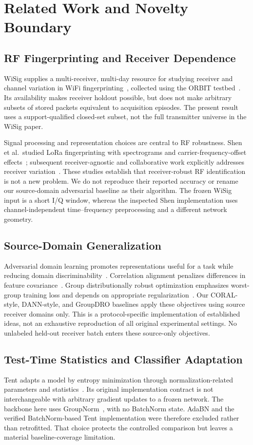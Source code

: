 \section{Related Work and Novelty Boundary}
\subsection{RF Fingerprinting and Receiver Dependence}
WiSig supplies a multi-receiver, multi-day resource for studying receiver and channel variation in WiFi fingerprinting~\cite{wisig}, collected using the ORBIT testbed~\cite{orbit}. Its availability makes receiver holdout possible, but does not make arbitrary subsets of stored packets equivalent to acquisition episodes. The present result uses a support-qualified closed-set subset, not the full transmitter universe in the WiSig paper.

Signal processing and representation choices are central to RF robustness. Shen et al.\ studied LoRa fingerprinting with spectrograms and carrier-frequency-offset effects~\cite{shenlora}; subsequent receiver-agnostic and collaborative work explicitly addresses receiver variation~\cite{shen}. These studies establish that receiver-robust RF identification is not a new problem. We do not reproduce their reported accuracy or rename our source-domain adversarial baseline as their algorithm. The frozen WiSig input is a short I/Q window, whereas the inspected Shen implementation uses channel-independent time--frequency preprocessing and a different network geometry.

\subsection{Source-Domain Generalization}
Adversarial domain learning promotes representations useful for a task while reducing domain discriminability~\cite{dann}. Correlation alignment penalizes differences in feature covariance~\cite{coral}. Group distributionally robust optimization emphasizes worst-group training loss and depends on appropriate regularization~\cite{groupdro}. Our CORAL-style, DANN-style, and GroupDRO baselines apply these objectives using source receiver domains only. This is a protocol-specific implementation of established ideas, not an exhaustive reproduction of all original experimental settings. No unlabeled held-out receiver batch enters these source-only objectives.

\subsection{Test-Time Statistics and Classifier Adaptation}
Tent adapts a model by entropy minimization through normalization-related parameters and statistics~\cite{tent}. Its original implementation contract is not interchangeable with arbitrary gradient updates to a frozen network. The backbone here uses GroupNorm~\cite{groupnorm}, with no BatchNorm state. AdaBN and the verified BatchNorm-based Tent implementation were therefore excluded rather than retrofitted. That choice protects the controlled comparison but leaves a material baseline-coverage limitation.

